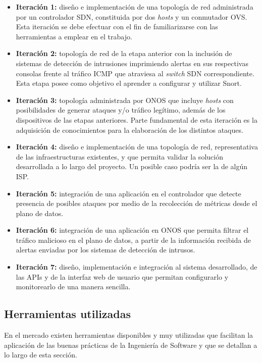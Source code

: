 \begin{itemize}
\item {\textbf{Iteración 1:} diseño e implementación de una topología de red administrada por un controlador SDN, constituida por dos \textit{hosts} y un conmutador OVS. Esta iteración se debe efectuar con el fin de familiarizarse con las herramientas a emplear en el trabajo.}
\item {\textbf{Iteración 2:} topología de red de la etapa anterior con la inclusión de sistemas de detección de intrusiones imprimiendo alertas en sus respectivas consolas frente al tráfico ICMP que atraviesa al \textit{switch} SDN correspondiente. Esta etapa posee como objetivo el aprender a configurar y utilizar Snort.}
\item {\textbf{Iteración 3:} topología administrada por ONOS que incluye \textit{hosts} con posibilidades de generar ataques y/o tráfico legítimo, además de los dispositivos de las etapas anteriores. Parte fundamental de esta iteración es la adquisición de conocimientos para la elaboración de los distintos ataques.}
\item {\textbf{Iteración 4:} diseño e implementación de una topología de red, representativa de las infraestructuras existentes, y que permita validar la solución desarrollada a lo largo del proyecto. Un posible caso podría ser la de algún ISP.}
\item {\textbf{Iteración 5:} integración de una aplicación en el controlador que detecte presencia de posibles ataques por medio de la recolección de métricas desde el plano de datos.}
\item {\textbf{Iteración 6:} integración de una aplicación en ONOS que permita filtrar el tráfico malicioso en el plano de datos, a partir de la información recibida de alertas enviadas por los sistemas de detección de intrusos.}
\item {\textbf{Iteración 7:} diseño, implementación e integración al sistema
    desarrollado, de las APIs y de la interfaz web de usuario que permitan
    configurarlo y monitorearlo de una manera sencilla.}
\end{itemize}


\subsection  {Herramientas utilizadas}

En el mercado existen herramientas disponibles y muy utilizadas que facilitan la aplicación de las buenas prácticas de la Ingeniería de Software y que se detallan a lo largo de esta sección. 

